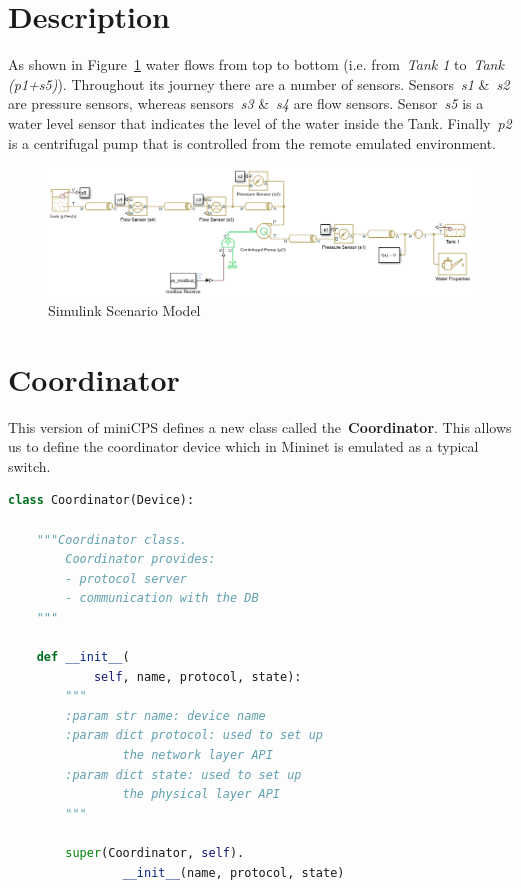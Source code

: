 \documentclass[book,a4paper,12pt,oneside]{memoir}
\begin{document}
\section{Description}
\label{cha:basicuse-sec:description}

As shown in Figure~\ref{fig:SimulinkModel} water flows from top to bottom (i.e. from~\textit{Tank 1} to~\textit{Tank (p1+s5)}).  Throughout its journey there are a number of sensors.  Sensors~\textit{s1} \&~\textit{s2} are pressure sensors, whereas sensors~\textit{s3} \&~\textit{s4} are flow sensors.  Sensor~\textit{s5} is a water level sensor that indicates the level of the water inside the Tank.
Finally~\textit{p2} is a centrifugal pump that is controlled from the remote emulated environment.


\begin{figure}[h!]
	\centering
	\includegraphics[scale=0.8, angle=90]{SimulinkScenario}
	\caption{Simulink Scenario Model}
	\label{fig:SimulinkModel}
\end{figure}


\section{Coordinator}
\label{cha:basicuse-sec:coordinator}

This version of miniCPS defines a new class called the~\textbf{Coordinator}.  This allows us to define the coordinator device which in Mininet is emulated as a typical switch.  

\begin{lstlisting}[backgroundcolor = \color{ultralightgray}, language = Python, xleftmargin = 0.1cm, framexleftmargin = 0.3em, showstringspaces=false]
class Coordinator(Device):

    """Coordinator class.
        Coordinator provides:
        - protocol server
        - communication with the DB
    """

    def __init__(
            self, name, protocol, state):
        """
        :param str name: device name
        :param dict protocol: used to set up 
                the network layer API
        :param dict state: used to set up 
                the physical layer API
        """

        super(Coordinator, self).
                __init__(name, protocol, state)
\end{lstlisting}
\end{document}
